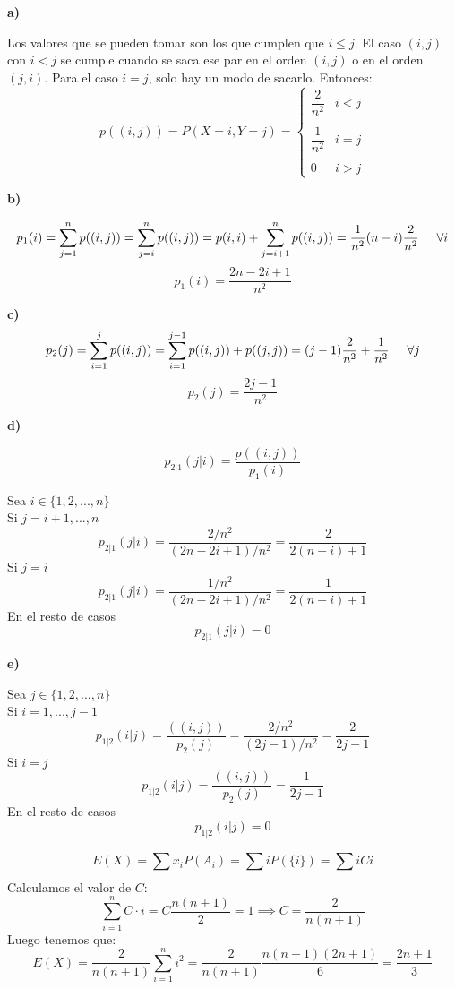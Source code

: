 \documentclass[openany]{book}
\begin{document}
\begin{exercise}
    $$  $$

    \textbf{a)}

    Los valores que se pueden tomar son los que cumplen que $ i\leq j $. El caso $ (i,j) $ con $ i<j $ se cumple cuando se saca ese par en el orden $ (i,j) $ o en el orden $ (j,i) $. Para el caso $ i=j $, solo hay un modo de sacarlo. Entonces:
    $$ p((i,j)) = P(X=i,Y=j) = \left\{
    \begin{array}{ll}
        \dfrac{2}{n^2} & i<j \\\\
        \dfrac{1}{n^2} & i = j \\ \\
        0 & i > j 
    \end{array}
    \right. $$

    \textbf{b)}
    

    $$ p_1(i) = \sum\limits_{j=1}^{n}  p((i,j)) = \sum\limits_{j=i}^{n} p((i,j)) = p(i,i) + \sum\limits_{j=i+1}^{n}p((i,j)) = \dfrac{1}{n^2}(n-i)\dfrac{2}{n^2}\hspace{5mm} \forall i$$
    $$ p_1(i) = \dfrac{2n-2i+1}{n^2} $$

    \textbf{c)}
    $$ p_2(j) = \sum\limits_{i=1}^{j}p((i,j)) = \sum\limits_{i=1}^{j-1}p((i,j)) + p((j,j)) = (j-1)\dfrac{2}{n^2}+\dfrac{1}{n^2}\hspace{5mm} \forall j$$
    $$  p_2(j) = \dfrac{2j-1}{n^2} $$

    \textbf{d)}

    $$ p_{2|1}(j|i) = \dfrac{p((i,j))}{p_1(i)}  $$

    Sea $  i \in \{1,2,...,n\} $\\
    Si $ j = i+1,...,n $
    $$ p_{2|1}(j|i) = \dfrac{2/n^2}{(2n-2i+1)/n^2} = \dfrac{2}{2(n-i)+1} $$
    Si $ j = i $
    $$ p_{2|1}(j|i) = \dfrac{1/n^2}{(2n-2i+1)/n^2} = \dfrac{1}{2(n-i)+1} $$
    En el resto de casos
    $$ p_{2|1}(j|i) = 0 $$

    \textbf{e)}

    Sea $ j \in \{1,2,...,n\} $\\
    Si $ i = 1,...,j-1 $
    $$ p_{1|2}(i|j) = \dfrac{((i,j))}{p_2(j)} = \dfrac{2/n^2}{(2j-1)/n^2} = \dfrac{2}{2j-1}$$
    Si $ i = j $
    $$ p_{1|2}(i|j) = \dfrac{((i,j))}{p_2(j)} = \dfrac{1}{2j-1}$$
    En el resto de casos
    $$ p_{1|2}(i|j) = 0 $$

\end{exercise}

\begin{exercise}
    $$ E(X) = \sum\limits_{}^{}x_iP(A_i) = \sum\limits_{}^{}iP(\{i\}) =\sum\limits_{}^{}i C i  $$
    Calculamos el valor de $ C $:
    $$ \sum\limits_{i=1}^{n}C\cdot i = C \dfrac{n(n+1)}{2} = 1 \implies C = \dfrac{2}{n(n+1)} $$
    Luego tenemos que:
    $$ E(X) = \dfrac{2}{n(n+1)}\sum\limits_{i=1}^{n}i^2 = \dfrac{2}{n(n+1)}\dfrac{n(n+1)(2n+1)}{6} = \dfrac{2n+1}{3} $$
\end{exercise}
\end{document}
